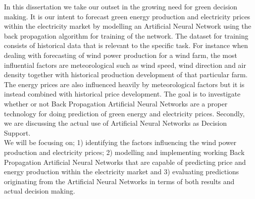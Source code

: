 In this dissertation we take our outset in the growing need for green decision making. It is our intent to forecast green energy production and electricity prices within the electricity market by modelling an Artificial Neural Network using the back propagation algorithm for training of the network. The dataset for training consists of historical data that is relevant to the specific task. For instance when dealing with forecasting of wind power production for a wind farm, the most influential factors are meteorological such as wind speed, wind direction and air density together with historical production development of that particular farm. The energy prices are also influenced heavily by meteorological factors but it is instead combined with historical price development.
The goal is to investigate whether or not Back Propagation Artificial Neural Networks are a proper technology for doing prediction of green energy and electricity prices. Secondly, we are discussing the actual use of Artificial Neural Networks as Decision Support.
\\[0.5cm]
We will be focusing on; 1) identifying the factors influencing the wind power production and electricity prices; 2) modelling and implementing working Back Propagation Artificial Neural Networks that are capable of predicting price and energy production within the electricity market and 3) evaluating predictions originating from the Artificial Neural Networks in terms of both results and actual decision making.